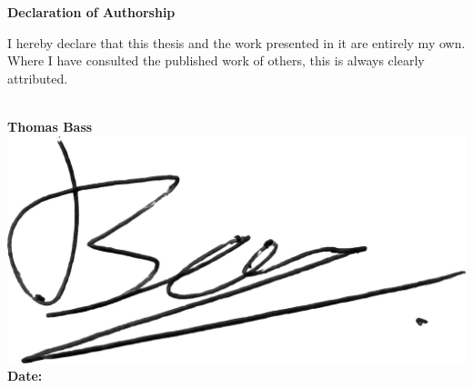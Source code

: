 \thispagestyle{empty}
\vspace*{\fill}
\begin{center}
    \textbf{Declaration of Authorship}
\end{center}
I hereby declare that this thesis and the work presented in it are entirely my own. Where I have consulted the published work of others, this is always clearly attributed. \\[4pt]
\\[4pt]


\begin{tabbing}
\textbf{Thomas Bass} \\[16pt]
\includegraphics*[width=0.2\linewidth]{signature.png} \\[8pt]
\textbf{Date:}  \\


\end{tabbing}
\vspace*{\fill}
